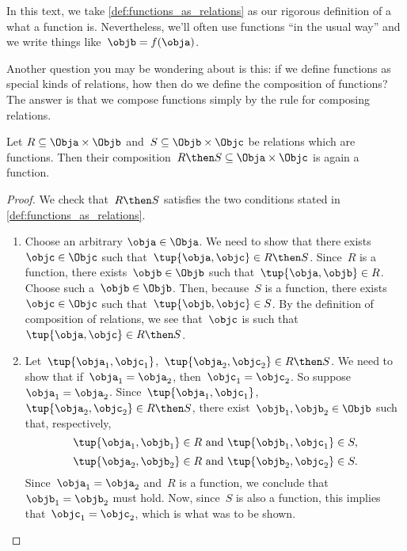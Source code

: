 In this text, we take \cref{def:functions_as_relations} as our rigorous definition of a what a function is. Nevertheless, we'll often use functions ``in the usual way'' and we write things like~$\objb = f(\obja)$.

Another question you may be wondering about is this: if we define functions as special kinds of relations, how then do we define the composition of functions? The answer is that we compose functions simply by the rule for composing relations.

\begin{lemma}
  \label{lem:comprelfun}
  Let $R \subseteq \Obja \times \Objb$ and~$S \subseteq \Objb \times \Objc$ be relations which are functions. Then their composition~$R \then S \subseteq \Obja \times \Objc$ is again a function.
\end{lemma}

\begin{proof}
  We check that~$R \then S$ satisfies the two conditions stated in \cref{def:functions_as_relations}.

  \begin{enumerate}
    \item Choose an arbitrary $\obja \in \Obja$. We need to show that there exists~$\objc \in \Objc$ such that~$\tup{\obja,\objc} \in R \then S$. Since~$R$ is a function, there exists~$\objb \in \Objb$ such that~$\tup{\obja,\objb} \in R$. Choose such a~$\objb \in \Objb$. Then, because~$S$ is a function, there exists~$\objc \in \Objc$ such that~$\tup{\objb,\objc} \in S$. By the definition of composition of relations, we see that~$\objc$ is such that~$\tup{\obja,\objc} \in R \then S$.
    \item Let~$\tup{\obja_1, \objc_1}$,~$\tup{\obja_2,\objc_2} \in R \then S$. We need to show that if~$\obja_1 = \obja_2$, then~$\objc_1 = \objc_2$. So suppose~$\obja_1 = \obja_2$. Since~$\tup{\obja_1, \objc_1}$,~$\tup{\obja_2,\objc_2} \in R \then S$, there exist~$\objb_1, \objb_2 \in \Objb$ such that, respectively,
    \begin{equation*}
      \tup{\obja_1, \objb_1} \in R \text{ and } \tup{\objb_1, \objc_1} \in S,
    \end{equation*}
    \begin{equation*}
      \tup{\obja_2, \objb_2} \in R \text{ and } \tup{\objb_2, \objc_2} \in S.
    \end{equation*}
    Since~$\obja_1 = \obja_2$ and~$R$ is a function, we conclude that~$\objb_1 = \objb_2$ must hold. Now, since~$S$ is also a function, this implies that~$\objc_1 = \objc_2$, which is what was to be shown.
  \end{enumerate}
\end{proof}

